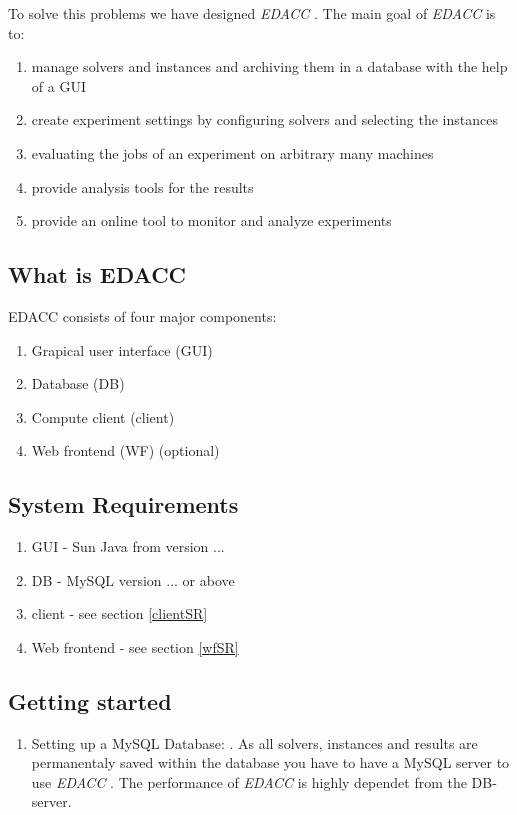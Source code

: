\documentclass[twoside,a4paper]{refart}
\theoremstyle{dotless}
\newcommand{\edacc}{\textit{EDACC} }
\newcounter{ex}
\begin{document}
To solve this problems we have designed \edacc. The main goal of \edacc is to:
\begin{enumerate}
	\item manage solvers and instances and archiving them in a database with the help of a GUI
	\item create experiment settings by configuring solvers and selecting the instances
	\item evaluating the jobs of an experiment on arbitrary many machines
	\item provide analysis tools for the results
	\item provide an online tool to monitor and analyze experiments
\end{enumerate}

\subsection{What is EDACC}
\marginlabel{\edacc Components}
EDACC consists of four major components:
\begin{enumerate}
	\item Grapical user interface (GUI) 
	\item Database (DB)
	\item Compute client (client) 
	\item Web frontend (WF) (optional)
\end{enumerate}

\subsection{System Requirements}

\begin{enumerate}
	\item GUI - Sun Java from version ... \attention
	\item DB - MySQL version ... or above \attention
	\item client - see section \ref{clientSR} \attention
	\item Web frontend - see section \ref{wfSR} \attention
\end{enumerate}

\subsection{Getting started}

\begin{enumerate}
	\item Setting up a MySQL Database: . As all solvers, instances and results are permanentaly saved within the database you have to have a MySQL server to use \edacc. The performance of \edacc is highly dependet from the DB-server. 
	
	
\end{enumerate}
\end{document}
